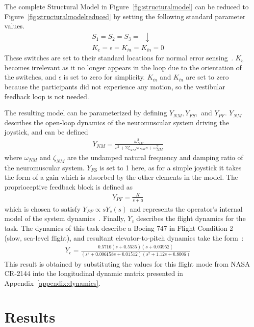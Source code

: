 The complete Structural Model in Figure~\ref{fig:structuralmodel} can be reduced to Figure~\ref{fig:structuralmodelreduced} by setting the following standard parameter values.
\begin{align}
    \nonumber    S_1 = S_2 = S_3 = \enspace \downarrow \\
    \nonumber    K_{\dot{e}} = \epsilon = K_{\dot{m}} = K_{\ddot{m}} = 0
\end{align}
These switches are set to their standard locations for normal error sensing~\citep{hess_unified_1997}.
$K_{\dot{e}}$ becomes irrelevant as it no longer appears in the loop due to the orientation of the switches, and $\epsilon$ is set to zero for simplicity.
$K_{\dot{m}}$ and $K_{\ddot{m}}$ are set to zero because the participants did not experience any motion, so the vestibular feedback loop is not needed.

The resulting model can be parameterized by defining $Y_{NM}, Y_{FS},$ and $Y_{PF}$.
$Y_{NM}$ describes the open-loop dynamics of the neuromuscular system driving the joystick, and can be defined
\begin{align}
    Y_{NM} = \frac{\omega^2_{NM}}{s^2 + 2 \zeta_{NM} \omega_{NM} s + \omega^2_{NM}}
\end{align}
where $\omega_{NM}$ and $\zeta_{NM}$ are the undamped natural frequency and damping ratio of the neuromuscular system.
$Y_{FS}$ is set to 1 here, as for a simple joystick it takes the form of a gain which is absorbed by the other elements in the model.
The proprioceptive feedback block is defined as
\begin{align} \label{eq:ypf}
    Y_{PF} = \frac{K}{s+a}
\end{align}
which is chosen to satisfy $Y_{PF} \propto s Y_c (s)$ and represents the operator's internal model of the system dynamics~\citep{hess_unified_1997}.
Finally, $Y_c$ describes the flight dynamics for the task.
The dynamics of this task describe a Boeing 747 in Flight Condition 2 (slow, sea-level flight), and resultant elevator-to-pitch dynamics take the form~\citep{heffley1972aircraft}:
\begin{align}
    Y_c = \frac{0.5716 (s+0.5535) (s+0.03952)}{(s^2 + 0.006158s + 0.01512) (s^2 + 1.12s + 0.8006)}
\end{align}
This result is obtained by substituting the values for this flight mode from NASA CR-2144 into the longitudinal dynamic matrix presented in Appendix~\ref{appendix:dynamics}.

\section{Results}

